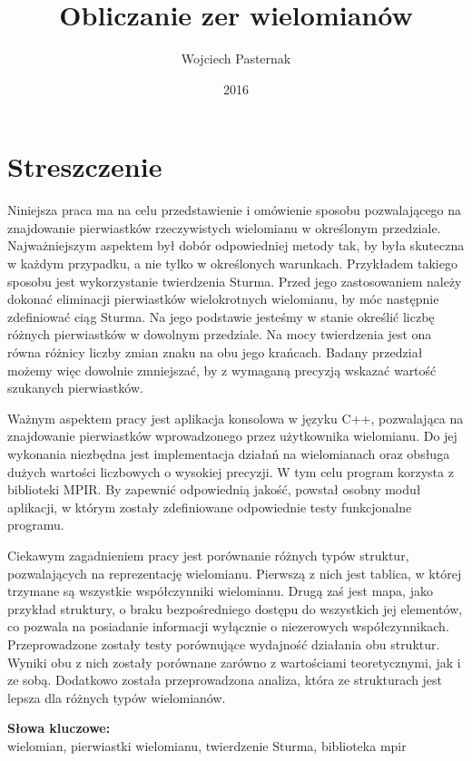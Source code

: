\documentclass[oneside,a4paper]{book}
\title{Obliczanie zer wielomianów}
\author{Wojciech Pasternak}
\date{2016}
\begin{document}
	
	
	
	\chapter*{Streszczenie}
	\indent
	Niniejsza praca ma na celu przedstawienie i omówienie sposobu pozwalającego na znajdowanie pierwiastków rzeczywistych wielomianu w określonym przedziale. Najważniejszym aspektem był dobór odpowiedniej metody tak, by była skuteczna w każdym przypadku, a nie tylko w określonych warunkach. Przykładem takiego sposobu jest wykorzystanie twierdzenia Sturma. Przed jego zastosowaniem należy dokonać eliminacji pierwiastków wielokrotnych wielomianu, by móc następnie zdefiniować ciąg Sturma. Na jego podstawie jesteśmy w stanie określić liczbę różnych pierwiastków w dowolnym przedziale.  Na mocy twierdzenia jest ona równa różnicy liczby zmian znaku na obu jego krańcach. Badany przedział możemy więc dowolnie zmniejszać, by z wymaganą precyzją wskazać wartość szukanych pierwiastków.
	
	Ważnym aspektem pracy jest aplikacja konsolowa w języku C++, pozwalająca na znajdowanie pierwiastków wprowadzonego przez użytkownika wielomianu. Do jej wykonania niezbędna jest implementacja działań na wielomianach oraz obsługa dużych wartości liczbowych o wysokiej precyzji. W tym celu program korzysta z biblioteki MPIR. By zapewnić odpowiednią jakość, powstał osobny moduł aplikacji, w którym zostały zdefiniowane odpowiednie testy funkcjonalne programu.
	
	Ciekawym zagadnieniem pracy jest porównanie różnych typów struktur, pozwalających na reprezentację wielomianu. Pierwszą z nich jest tablica, w której trzymane są wszystkie współczynniki wielomianu. Drugą zaś jest mapa, jako przykład struktury, o braku bezpośredniego dostępu do wszystkich jej elementów, co pozwala na posiadanie informacji wyłącznie o niezerowych współczynnikach. Przeprowadzone zostały testy porównujące wydajność działania obu struktur. Wyniki obu z nich zostały porównane zarówno z wartościami teoretycznymi, jak i ze sobą. Dodatkowo została przeprowadzona analiza, która ze strukturach jest lepsza dla różnych typów wielomianów.
	
	\vspace{12pt}
	\noindent\textbf{Słowa kluczowe:}\\ wielomian, pierwiastki wielomianu, twierdzenie Sturma, biblioteka mpir
	
\end{document}
